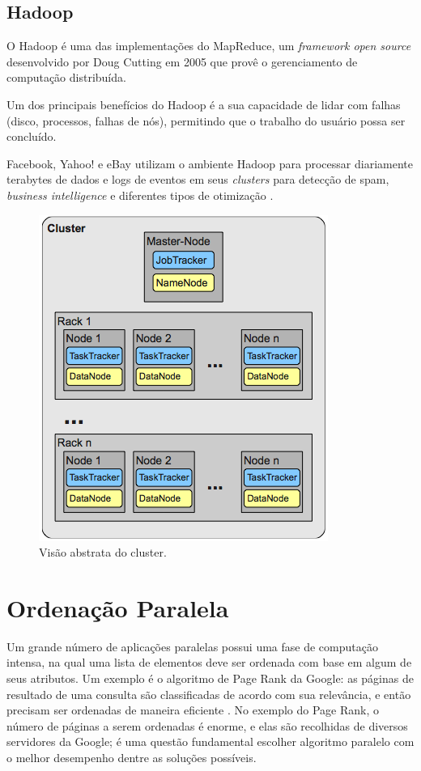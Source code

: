 \subsection{Hadoop}


O Hadoop \cite{Hadoop:2010} é uma das implementações do MapReduce, um \textit{framework open source } desenvolvido por Doug Cutting em 2005 que provê o gerenciamento de computação distribuída.

Um dos principais benefícios do Hadoop é a sua capacidade de lidar com falhas (disco, processos, falhas de nós), permitindo que o trabalho do usuário possa ser concluído.

Facebook, Yahoo! e eBay utilizam o ambiente Hadoop para processar diariamente terabytes de dados e logs de eventos em seus \textit{clusters} para detecção de spam, \textit{business intelligence} e diferentes tipos de otimização \cite{Cherkasova:2011}.
 
 \begin{figure}[htb]
 \centering
\includegraphics[scale=.65]{figuras/HadoopCluster.png} 
\caption{Visão abstrata do cluster.}
\end{figure}

\section{Ordenação Paralela}


Um grande número de aplicações paralelas possui uma fase de computação intensa, na qual uma lista de elementos deve ser ordenada com base em algum de seus atributos. Um exemplo é o algoritmo de Page Rank \cite{Page:1999} da Google: as páginas de resultado de uma consulta são classificadas de acordo com sua relevância, e então precisam ser ordenadas de maneira eficiente \cite{Kale:2010}.
No exemplo do Page Rank, o número de páginas a serem ordenadas é enorme, e elas são recolhidas de diversos servidores da Google; é uma questão fundamental escolher algoritmo paralelo com o melhor desempenho dentre as soluções possíveis.


